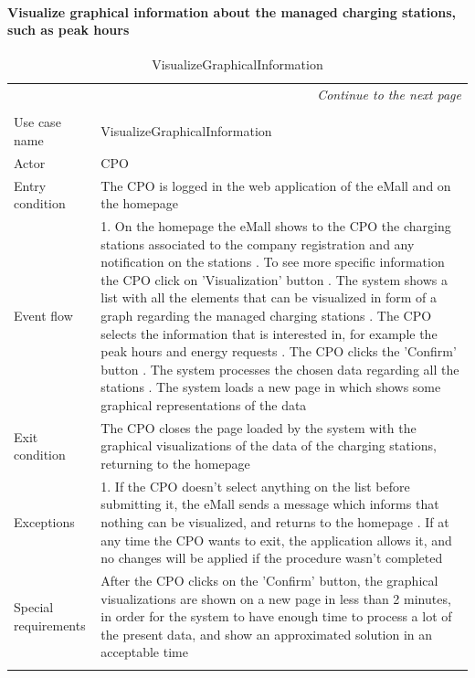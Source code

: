 \paragraph{Visualize graphical information about the managed charging stations, such as peak hours}
\begin{center}
    \begin{longtable}{p{4cm} p{11cm}}
    \multicolumn{2}{r}{\itshape{Continue to the next page}}\\
    \endfoot 
    \\
    \endlastfoot
    \hline
     Use case name &  VisualizeGraphicalInformation\\
     \hline
     Actor & CPO \\
     \hline
     Entry condition & The CPO is logged in the web application of the eMall and on the homepage \\
     \hline
     Event flow &   1. On the homepage the eMall shows to the CPO the charging stations associated to the company                   registration and any notification on the stations \newline
                    2. To see more specific information the CPO click on 'Visualization' button \newline 
                    3. The system shows a list with all the elements that can be visualized in form of a graph regarding the managed charging stations \newline
                    4. The CPO selects the information that is interested in, for example the peak hours and energy requests \newline
                    5. The CPO clicks the 'Confirm' button \newline
                    6. The system processes the chosen data regarding all the stations \newline
                    7. The system loads a new page in which shows some graphical representations of the data \\
     \hline
     Exit condition &  The CPO closes the page loaded by the system with the graphical visualizations of the data of the charging stations, returning to the homepage \\
     \hline
     Exceptions &   1. If the CPO doesn't select anything on the list before submitting it, the eMall sends a                       message which informs that nothing can be visualized, and returns to the homepage \newline
                    2. If at any time the CPO wants to exit, the application allows it, and no changes will be applied if the procedure wasn't completed \\
     \hline
     Special requirements & After the CPO clicks on the 'Confirm' button, the graphical visualizations are shown on a new page in less than 2 minutes, in order for the system to have enough time to process a lot of the present data, and show an approximated solution in an acceptable time \\
     \hline
    \caption{VisualizeGraphicalInformation}
    \label{tab:VisualizeGraphicalInformation}
    \end{longtable}
\end{center}